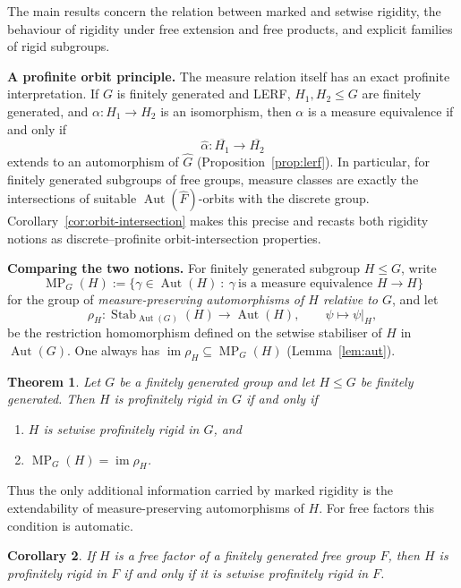 \documentclass[11pt]{amsart}
\theoremstyle{plain}
\newtheorem{theorem}{Theorem}[section]
\newtheorem{corollary}[theorem]{Corollary}
\theoremstyle{definition}
\newcommand{\Aut}{\operatorname{Aut}}
\newcommand{\Stab}{\operatorname{Stab}}
\newcommand{\MP}{\operatorname{MP}}
\begin{document}
The main results concern the relation between marked and setwise rigidity, the
behaviour of rigidity under free extension and free products, and explicit
families of rigid subgroups.

\medskip\noindent\textbf{A profinite orbit principle.}
The measure relation itself has an exact profinite interpretation.  If $G$ is
finitely generated and LERF, $H_1,H_2\le G$ are finitely generated, and
$\alpha\colon H_1\to H_2$ is an isomorphism, then $\alpha$ is a measure
equivalence if and only if
\[
  \widehat\alpha\colon\overline{H_1}\longrightarrow\overline{H_2}
\]
extends to an automorphism of $\widehat G$ (Proposition~\ref{prop:lerf}).  In
particular, for finitely generated subgroups of free groups, measure classes are
exactly the intersections of suitable $\Aut(\widehat F)$-orbits with the
discrete group.  Corollary~\ref{cor:orbit-intersection} makes this precise and
recasts both rigidity notions as discrete--profinite orbit-intersection
properties.

\medskip\noindent\textbf{Comparing the two notions.}
For finitely generated subgroup $H\le G$,  write
\[
  \MP_G(H):=\{\gamma\in\Aut(H)\ :\ \gamma\ \text{is a measure equivalence }H\to H\}
\]
for the group of \emph{measure-preserving automorphisms of $H$ relative to
$G$}, and let
\[
  \rho_H\colon \Stab_{\Aut(G)}(H)\longrightarrow\Aut(H),\qquad
  \psi\longmapsto\psi|_H,
\]
be the restriction homomorphism defined on the setwise stabiliser of $H$ in
$\Aut(G)$. One always has $\operatorname{im}\rho_H\subseteq\MP_G(H)$
(Lemma~\ref{lem:aut}).
\begin{theorem}\label{thm:setwise-marked}
Let $G$ be a finitely generated group and let $H\le G$ be finitely generated.
Then $H$ is profinitely rigid in $G$ if and only if
\begin{enumerate}
\item[(i)] $H$ is setwise profinitely rigid in $G$, and
\item[(ii)] $\MP_G(H)=\operatorname{im}\rho_H$.
\end{enumerate}
\end{theorem}
Thus the only additional information carried by marked rigidity is the
extendability of measure-preserving automorphisms of $H$. For free factors this
condition is automatic.
\begin{corollary}\label{cor:ff-setwise-marked}
If $H$ is a free factor of a finitely generated free group $F$, then $H$ is
profinitely rigid in $F$ if and only if it is setwise profinitely rigid in $F$.
\end{corollary}
\end{document}
